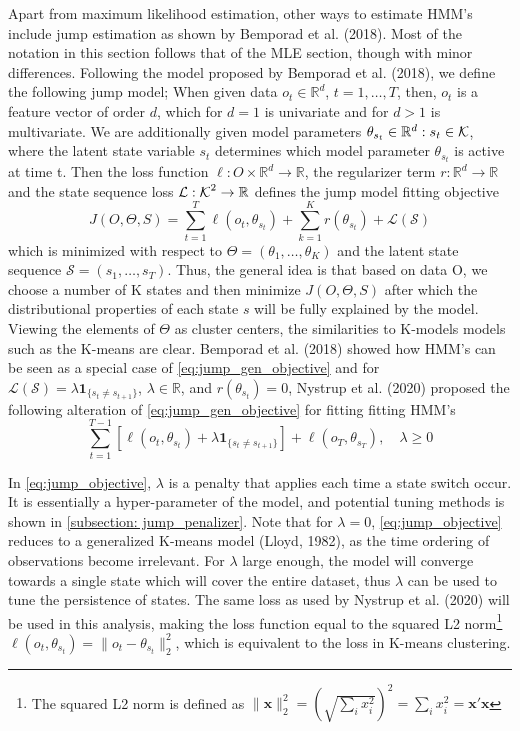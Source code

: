 Apart from maximum likelihood estimation, other ways to estimate HMM's include jump estimation as shown by Bemporad et al. (2018). Most of the notation in this section follows that of the MLE section, though with minor differences. Following the model proposed by Bemporad et al. (2018), we define the following jump model; When given data $o_t\in \mathbb{R}^d$, $t=1,\ldots,T$, then, $o_t$ is a feature vector of order $d$, which for $d=1$ is univariate and for $d>1$ is multivariate. We are additionally given model parameters $\theta_{s_t}\in \mathbb{R}^d:s_t\in\operatorname{\mathcal{K}}$, where the latent state variable $s_t$ determines which model parameter $\theta_{s_t}$ is active at time t. Then the loss function $\ell: O\times\mathbb{R}^d \rightarrow\mathbb{R}$, the regularizer term $r: \mathbb{R}^d \rightarrow \mathbb{R}$ and the state sequence loss $\mathcal{L}:\operatorname{\mathcal{K}}^2 \rightarrow \mathbb{R}$ defines the jump model fitting objective
\begin{equation}
    J(O, \Theta, S) = \sum_{t=1}^T \ell(o_t,\theta_{s_t}) + \sum_{k=1}^K r(\theta_{s_t}) + \mathcal{L(S)}
\label{eq:jump_gen_objective}    
\end{equation}
which is minimized with respect to $\Theta=(\theta_1,\ldots,\theta_K)$ and the latent state sequence $\mathcal{S}=(s_1,\ldots,s_T)$. Thus, the general idea is that based on data O, we choose a number of K states and then minimize $J(O, \Theta, S)$ after which the distributional properties of each state $s$ will be fully explained by the model. Viewing the elements of $\Theta$ as cluster centers, the similarities to K-models models such as the K-means are clear. Bemporad et al. (2018) showed how HMM's can be seen as a special case of \cref{eq:jump_gen_objective} and for $\mathcal{L(S)} = \lambda\mathbf{1}_{\{ s_t\ne s_{t+1}\}}$, $\lambda \in \mathbb{R}$, and $r(\theta_{s_t})=0$, Nystrup et al. (2020) proposed the following alteration of \cref{eq:jump_gen_objective} for fitting fitting HMM's
\begin{equation}
    \sum_{t=1}^{T-1}[\ell(o_t, \theta_{s_t}) + \lambda\mathbf{1}_{\{ s_t\ne s_{t+1} \}}]
    + \ell(o_T, \theta_{s_T})
    ,\quad \lambda \geq 0
\label{eq:jump_objective}
\end{equation}

In \cref{eq:jump_objective}, $\lambda$ is a penalty that applies each time a state switch occur. It is essentially a hyper-parameter of the model, and potential tuning methods is shown in \cref{subsection: jump_penalizer}. Note that for $\lambda=0$, \cref{eq:jump_objective} reduces to a generalized K-means model (Lloyd, 1982), as the time ordering of observations become irrelevant. For $\lambda$ large enough, the model will converge towards a single state which will cover the entire dataset, thus $\lambda$ can be used to tune the persistence of states. The same loss as used by Nystrup et al. (2020) will be used in this analysis, making the loss function equal to the squared L2 norm\footnote{The squared L2 norm is defined as $\|\mathbf{x}\|_2^2 = (\sqrt{\sum_i x_i^2})^2 = \sum_i x_i^2 = \mathbf{x'x} $} $\ell(o_t, \theta_{s_t}) = \| o_t - \theta_{s_t} \|_2^2$, which is equivalent to the loss in K-means clustering.

